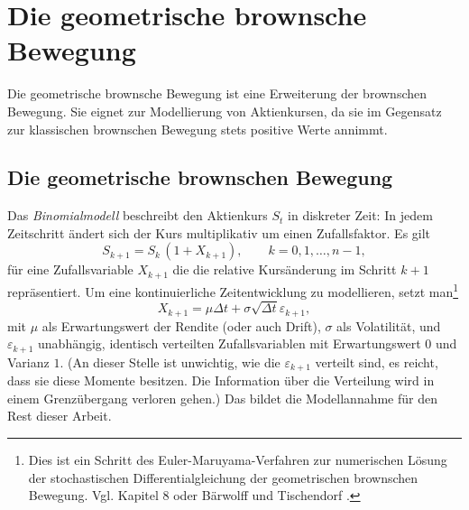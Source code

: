 \section{Die geometrische brownsche Bewegung}

Die geometrische brownsche Bewegung ist eine Erweiterung der brownschen Bewegung. 
Sie eignet zur Modellierung von Aktienkursen, da sie im Gegensatz zur klassischen 
brownschen Bewegung stets positive Werte annimmt.


\subsection{Die geometrische brownschen Bewegung}

Das \textit{Binomialmodell} beschreibt den Aktienkurs $S_t$ in diskreter Zeit: In jedem Zeitschritt ändert sich der Kurs multiplikativ um einen Zufallsfaktor. Es gilt
$$
S_{k+1} = S_k \,(1 + X_{k+1}), \qquad k = 0,1,\dots,n-1,
$$
für eine Zufallsvariable $X_{k+1}$ die die relative Kursänderung im Schritt $k+1$ repräsentiert. Um eine kontinuierliche Zeitentwicklung zu modellieren, 
setzt man\footnote{Dies ist ein Schritt des Euler-Maruyama-Verfahren zur numerischen Lösung der 
stochastischen Differentialgleichung der geometrischen brownschen Bewegung. Vgl. Kapitel 8 oder Bärwolff und Tischendorf \cite{Baerwolff2025}.}
$$
X_{k+1} = \mu  \Delta t + \sigma \sqrt{\Delta t}\varepsilon_{k+1},
$$
mit $\mu$ als Erwartungswert der Rendite (oder auch Drift), $\sigma$ als Volatilität, und $\varepsilon_{k+1}$ unabhängig, identisch verteilten Zufallsvariablen mit Erwartungswert $0$ und Varianz $1$. 
(An dieser Stelle ist unwichtig, wie die $\varepsilon_{k+1}$ verteilt sind, es reicht, dass sie diese Momente besitzen. 
Die Information über die Verteilung wird in einem Grenzübergang verloren gehen.)
Das bildet die Modellannahme für den Rest dieser Arbeit.

